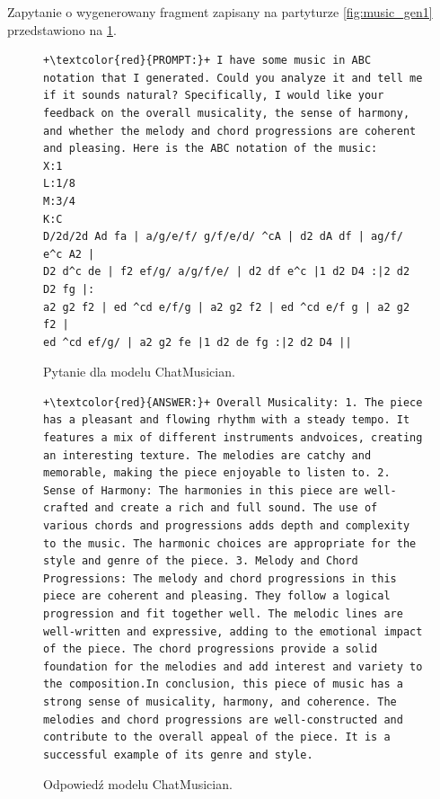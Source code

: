 \documentclass[data-science]{agh-wi} %
\begin{document}
Zapytanie o wygenerowany fragment zapisany na partyturze \ref*{fig:music_gen1} przedstawiono na \ref*{code:chat_prompt1}.

\begin{figure}[ht!]
    \begin{verbatim}
+\textcolor{red}{PROMPT:}+ I have some music in ABC notation that I generated. Could you analyze it and tell me if it sounds natural? Specifically, I would like your feedback on the overall musicality, the sense of harmony, and whether the melody and chord progressions are coherent and pleasing. Here is the ABC notation of the music:
X:1
L:1/8
M:3/4
K:C
D/2d/2d Ad fa | a/g/e/f/ g/f/e/d/ ^cA | d2 dA df | ag/f/ e^c A2 | 
D2 d^c de | f2 ef/g/ a/g/f/e/ | d2 df e^c |1 d2 D4 :|2 d2 D2 fg |:
a2 g2 f2 | ed ^cd e/f/g | a2 g2 f2 | ed ^cd e/f g | a2 g2 f2 | 
ed ^cd ef/g/ | a2 g2 fe |1 d2 de fg :|2 d2 D4 ||
    \end{verbatim}
    \caption{Pytanie dla modelu ChatMusician.}\label{code:chat_prompt1}
\end{figure}

\begin{figure}[ht!]
    \begin{verbatim}
+\textcolor{red}{ANSWER:}+ Overall Musicality: 1. The piece has a pleasant and flowing rhythm with a steady tempo. It features a mix of different instruments andvoices, creating an interesting texture. The melodies are catchy and memorable, making the piece enjoyable to listen to. 2. Sense of Harmony: The harmonies in this piece are well-crafted and create a rich and full sound. The use of various chords and progressions adds depth and complexity to the music. The harmonic choices are appropriate for the style and genre of the piece. 3. Melody and Chord Progressions: The melody and chord progressions in this piece are coherent and pleasing. They follow a logical progression and fit together well. The melodic lines are well-written and expressive, adding to the emotional impact of the piece. The chord progressions provide a solid foundation for the melodies and add interest and variety to the composition.In conclusion, this piece of music has a strong sense of musicality, harmony, and coherence. The melodies and chord progressions are well-constructed and contribute to the overall appeal of the piece. It is a successful example of its genre and style.
    \end{verbatim}
    \caption{Odpowiedź modelu ChatMusician.}\label{code:chat_answer1}
\end{figure}
\end{document}
